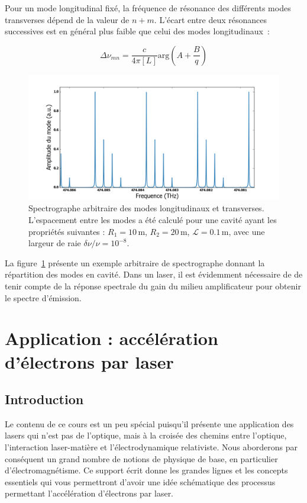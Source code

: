 \documentclass[a4paper]{book}
\begin{document}
Pour un mode longitudinal fixé, la fréquence de résonance des différents modes transverses dépend de la valeur de $n+m$. L'écart entre deux résonances successives est en général plus faible que celui des modes longitudinaux~:

\begin{equation}
    \Delta\nu_{mn}=\frac{c}{4\pi[L]}\mathrm{arg}\left(A+\frac{B}{q}\right)
\end{equation}

\begin{figure}[!htbp]
\begin{center}
\includegraphics[width=15cm]{pictures/ModeAmplitude.png}
\end{center}
\caption{Spectrographe arbitraire des modes longitudinaux et transverses. L'espacement entre les modes a été calculé pour une cavité ayant les propriétés suivantes : $R_1 = 10\,$m, $R_2 = 20\,$m, $\mathcal{L} = 0.1\,$m, avec une largeur de raie $\delta\nu/\nu = 10^{-8}$.}
\label{fig:modes_long_et_trans}
\end{figure}

La figure~\ref{fig:modes_long_et_trans} présente un exemple arbitraire de spectrographe donnant la répartition des modes en cavité. Dans un laser, il est évidemment nécessaire de de tenir compte de la réponse spectrale du gain du milieu amplificateur pour obtenir le spectre d'émission. 


\chapter{Application : accélération d'électrons par laser}

\section{Introduction}
Le contenu de ce cours est un peu spécial puisqu'il présente une application des lasers qui n'est pas de l'optique, mais à la croisée des chemins entre l'optique, l'interaction laser-matière et l'électrodynamique relativiste. Nous aborderons par conséquent un grand nombre de notions de physique de base, en particulier d'électromagnétisme. Ce support écrit donne les grandes lignes et les concepts essentiels qui vous permettront d'avoir une idée schématique des processus permettant l'accélération d'électrons par laser. 
\end{document}

